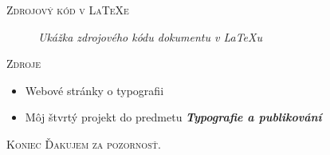 \documentclass[xcolor=dvipsnames]{beamer}
\begin{document}
\begin{frame}{\textsc{\large{Zdrojový kód v \LaTeX e}}}
	\begin{figure}[ht]
		\begin{center}
    		\caption{\textit{Ukážka zdrojového kódu dokumentu v \LaTeX u}}
		\end{center}
	\end{figure}
\end{frame}


\begin{frame}{\textsc{\large{Zdroje}}}
  \begin{itemize}
  \bigskip
		\item Webové stránky o typografii
		\item Môj štvrtý projekt do predmetu \emph{\textbf{\color{Favourite_colour}Typografie a publikování}}
	\end{itemize} 
\end{frame}

\begin{frame}{\textsc{\large{Koniec}}}
	\centering
	\LARGE\textsc{Ďakujem za pozornosť.}
\end{frame}
\end{document}
